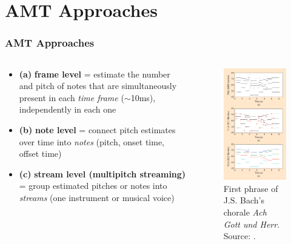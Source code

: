 \documentclass{beamer}
\newcommand{\emp}[1]{\textcolor{tum}{\textbf{#1}}}
\begin{document}
\section{AMT Approaches}
\begin{frame}[shrink=15]
	\frametitle{AMT Approaches}

	\begin{columns}
		\begin{column}{0.4\textwidth}
			\begin{itemize}
				\item \emp{(a)} \textbf{frame level} = estimate the number and pitch of notes that are simultaneously present in each \textit{time frame} ($\sim$10ms), independently in each one
				      \vspace{2mm}
				\item \emp{(b)} \textbf{note level} = connect pitch estimates over time into \textit{notes} (pitch, onset time, offset time)
				      \vspace{2mm}
				\item \emp{(c)} \textbf{stream level (multipitch streaming)}  = group estimated pitches or notes into \textit{streams} (one instrument or musical voice)
			\end{itemize}
		\end{column}

		\begin{column}{0.6\textwidth}
			\begin{figure}[!ht]
				\centering
				\includegraphics[width=.55\textwidth]{transcriptions.png}
				\caption{First phrase of J.S. Bach's chorale \textit{Ach Gott und Herr}. Source: \cite{Overview}.}
				\label{fig:transcriptions}
			\end{figure}
		\end{column}
	\end{columns}

\end{frame}
\end{document}
